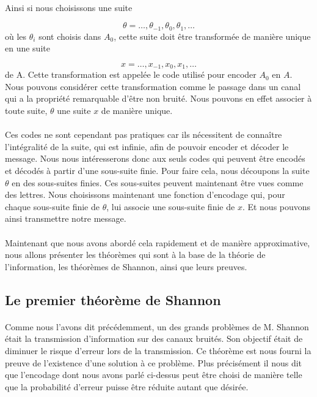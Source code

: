 	\paragraph{}
	Ainsi si nous choisissons une suite

	\[\theta = \dots,\theta_{-1},\theta_{0},\theta_{1},\dots\]
	où les $\theta_i$ sont choisis dans $A_0$, cette suite doit être
	transformée de manière unique en une suite

	\[x = \dots,x_{-1},x_{0},x_{1},\dots\]
	de A. Cette transformation est appelée le code utilisé pour encoder $A_0$
	en $A$. Nous pouvons considérer cette transformation comme le passage dans
	un canal qui a la propriété remarquable d'être non bruité. Nous pouvons en
	effet associer à toute suite, $\theta$ une suite $x$ 
	de manière unique. 

	\paragraph{}
	Ces codes ne sont cependant pas pratiques car ils nécessitent de connaître
	l'intégralité de la suite, qui est infinie, afin de pouvoir encoder et 
	décoder le message. Nous  nous intéresserons donc aux seuls codes qui
	peuvent être encodés et décodés à partir d'une sous-suite finie. Pour 
	faire cela, nous découpons la suite $\theta$ en des sous-suites 
	finies. Ces sous-suites peuvent maintenant être vues comme des lettres. 
	Nous choisissons maintenant une fonction d'encodage qui, pour chaque 
	sous-suite finie de $\theta$, lui associe une sous-suite finie
	de $x$. Et nous pouvons ainsi transmettre notre message.
	
	\paragraph{}
	Maintenant que nous avons abordé cela rapidement et de manière 
	approximative, nous allons présenter les théorèmes qui sont à la base
	de la théorie de l'information, les théorèmes
	de Shannon, ainsi que leurs preuves.

\subsection{Le premier théorème de Shannon}

	\paragraph{}
	Comme nous l'avons dit précédemment, un des grands problèmes de M. Shannon
	était la transmission d'information sur des canaux bruités. Son objectif
	était de diminuer le risque d'erreur lors de la transmission. Ce théorème
	est nous fourni la preuve de l'existence d'une solution à ce problème. 
	Plus précisément il nous dit que l'encodage dont nous avons parlé ci-dessus
	peut être choisi de manière telle que la probabilité d'erreur puisse être 
	réduite autant que désirée.

